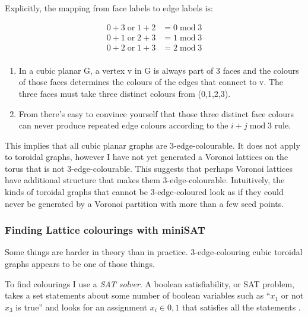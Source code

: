 Explicitly, the mapping from face labels to edge labels is:

\[\begin{aligned}
0 + 3 \;\mathrm{or}\; 1 + 2 &= 0 \;\mathrm{mod}\; 3\\ 
0 + 1 \;\mathrm{or}\; 2 + 3 &= 1 \;\mathrm{mod}\; 3\\
0 + 2 \;\mathrm{or}\;1 + 3 &= 2 \;\mathrm{mod}\; 3\\
\end{aligned}
\]

\begin{enumerate}
\def\labelenumi{\arabic{enumi}.}
\setcounter{enumi}{2}
\tightlist
\item
  In a cubic planar G, a vertex v in G is always part of 3 faces and the colours of those faces determines the colours of the edges that connect to v. The three faces must take three distinct colours from (0,1,2,3).
\item
  From there's easy to convince yourself that those three distinct face colours can never produce repeated edge colours according to the \(i+j \;\mathrm{mod}\; 3\) rule.
\end{enumerate}

This implies that all cubic planar graphs are 3-edge-colourable. It does not apply to toroidal graphs, however I have not yet generated a Voronoi lattices on the torus that is not 3-edge-colourable. This suggests that perhaps Voronoi lattices have additional structure that makes them 3-edge-colourable. Intuitively, the kinds of toroidal graphs that cannot be 3-edge-coloured look as if they could never be generated by a Voronoi partition with more than a few seed points.

\hypertarget{finding-lattice-colourings-with-minisat}{%
\subsubsection{Finding Lattice colourings with miniSAT}\label{finding-lattice-colourings-with-minisat}}

Some things are harder in theory than in practice. 3-edge-colouring cubic toroidal graphs appears to be one of those things.

To find colourings I use a \emph{SAT solver}. A boolean satisfiability, or SAT problem, takes a set statements about some number of boolean variables such as ``\(x_1\) or not \(x_3\) is true'' and looks for an assignment \(x_i \in {0,1}\) that satisfies all the statements \autocite{Karp1972}.


